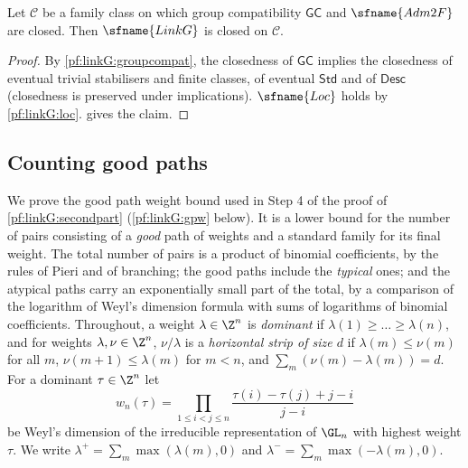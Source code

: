 \begin{theorem}\label{pf:linkG:main}
Let $\mathcal C$ be a family class on which group compatibility $\mathsf{GC}$ and $\sfname{Adm2F}$ are closed. Then
$\sfname{LinkG}$ is closed on $\mathcal C$.
\end{theorem}

\begin{proof}
By \cref{pf:linkG:groupcompat}, the closedness of $\mathsf{GC}$ implies the closedness of eventual
trivial stabilisers and finite classes, of eventual $\mathsf{Std}$ and of $\mathsf{Desc}$ (closedness is preserved
under implications). $\sfname{Loc}$ holds by \cref{pf:linkG:loc}.  gives the claim.
\end{proof}


\subsection{Counting good paths}\label{sec:pf:linkG:goodpaths}

We prove the good path weight bound used in Step 4 of the proof of \cref{pf:linkG:secondpart}
(\cref{pf:linkG:gpw} below). It is a lower bound for the number of pairs consisting of a \emph{good} path of weights and a
standard family for its final weight. The total number of pairs is a product of binomial coefficients, by the rules of
Pieri and of branching; the good paths include the \emph{typical} ones; and the atypical paths carry an exponentially small
part of the total, by a comparison of the logarithm of Weyl's dimension formula with sums of logarithms of binomial
coefficients. Throughout, a weight $\lambda\in\Z^n$ is \emph{dominant} if $\lambda(1)\ge\dots\ge\lambda(n)$, and for weights
$\lambda,\nu\in\Z^n$, $\nu/\lambda$ is a \emph{horizontal strip of size $d$} if $\lambda(m)\le\nu(m)$ for all $m$,
$\nu(m+1)\le\lambda(m)$ for $m<n$, and $\sum_m(\nu(m)-\lambda(m))=d$. For a dominant $\tau\in\Z^n$ let
\[
w_n(\tau)=\prod_{1\le i<j\le n}\frac{\tau(i)-\tau(j)+j-i}{j-i}
\]
be Weyl's dimension of the irreducible representation of $\GL_n$ with highest weight $\tau$. We write
$\lambda^+=\sum_m\max(\lambda(m),0)$ and $\lambda^-=\sum_m\max(-\lambda(m),0)$.


